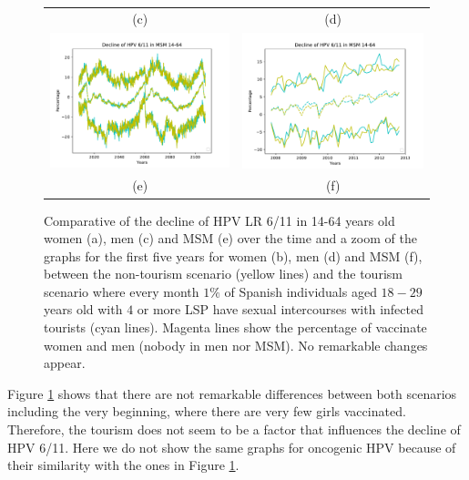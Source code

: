 \begin{figure}[!]
\begin{tabular}{cc}
		(c)	& (d) \\ 		
		\includegraphics[width=0.5\linewidth]{IMGs/8.-Turismo/verr_MSM.pdf}	& 
		\includegraphics[width=0.5\linewidth]{IMGs/8.-Turismo/verr_MSM_ZOOM.pdf}  \\ 
		(e)	& (f)
 	\end{tabular} 
	\caption{Comparative of the decline of  HPV LR 6/11 in 14-64 years old women (a), men (c) and MSM (e) over the time and a zoom of the graphs for the first five years for women (b), men (d) and MSM (f), between the non-tourism scenario (yellow lines) and the tourism scenario where every month $1\%$ of Spanish individuals aged $18-29$ years old with $4$ or more LSP have sexual intercourses with infected tourists (cyan lines). Magenta lines show the percentage of vaccinate women and men (nobody in men nor MSM). No remarkable changes appear.}
	\label{fig:turismo}
\end{figure}

Figure \ref{fig:turismo} shows that there are not remarkable differences between both scenarios including the very beginning, where there are very few girls vaccinated. Therefore, the tourism does not seem to be a factor that influences the decline of HPV 6/11. Here we do not show the same graphs for oncogenic HPV because of their similarity with the ones in Figure \ref{fig:turismo}. 
